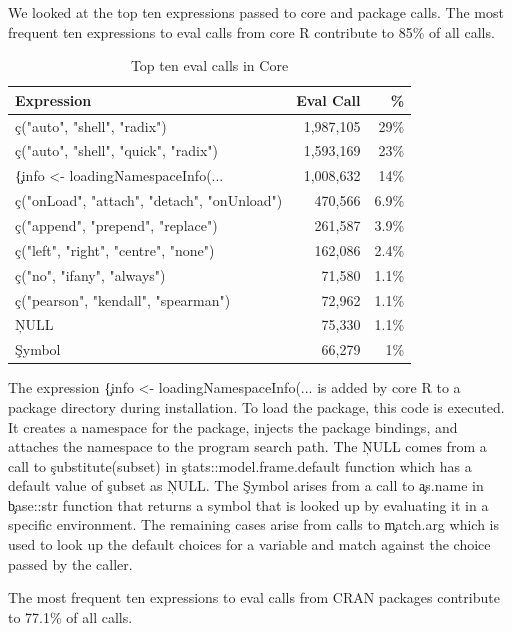 \documentclass[conference]{IEEEtran}
\begin{document}
We looked at the top ten expressions passed to core and package \eval
calls. The most frequent ten expressions to eval calls from core R
contribute to 85\% of all \eval calls.

\begin{table}[!h] \centering
\begin{tabular}{@{}l|rr@{}} \hline
Expression & Eval Call &  \% \\\hline
\c{c("auto", "shell", "radix")} & 1,987,105 & 29\%\\
\c{c("auto", "shell", "quick", "radix")} & 1,593,169  & 23\%\\
\c{\{info <- loadingNamespaceInfo(...} & 1,008,632 &       14\%\\
\c{c("onLoad", "attach", "detach", "onUnload")}   & 470,566 &      6.9\%\\
\c{c("append", "prepend", "replace")} &              261,587&       3.9\% \\
\c{c("left", "right", "centre", "none")} & 162,086     & 2.4\%\\
\c{c("no", "ifany", "always")}   &                71,580 &       1.1\%\\
\c{c("pearson", "kendall", "spearman")}  & 72,962 &      1.1\%\\
\c{NULL}& 75,330  &      1.1\% \\
\c{Symbol}&                 66,279&       1\%\\\hline
\end{tabular}
\caption{Top ten eval calls in Core}\label{B}
\end{table}

The expression \c{\{info <- loadingNamespaceInfo(...} is added by core R
to a package directory during installation. To load the package, this code is
executed. It creates a namespace for the package, injects the package bindings,
and attaches the namespace to the program search path. The \c{NULL} comes from a
call to \c{substitute(subset)} in \c{stats::model.frame.default} function which
has a default value of \c{subset} as \c{NULL}. The \c{Symbol} arises from a
call to \c{as.name} in \c{base::str} function that returns a symbol that is
looked up by evaluating it in a specific environment. The remaining cases arise
from calls to \c{match.arg} which is used to look up the default choices for a
variable and match against the choice passed by the caller.

The most frequent ten expressions to eval calls from CRAN packages
contribute to 77.1\% of all \eval calls.
\end{document}
